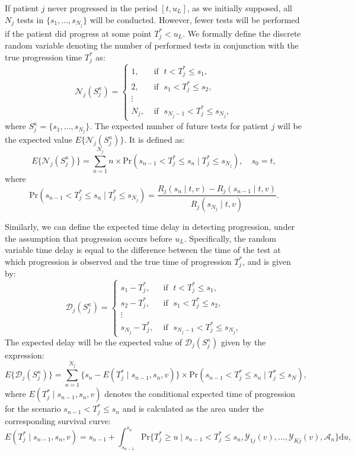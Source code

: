 If patient $j$ never progressed in the period $[t, u_L]$, as we initially supposed, all $N_j$ tests in $\{s_1, \ldots, s_{N_j}\}$ will be conducted. However, fewer tests will be performed if the patient did progress at some point $T_j^* < u_L$. We formally define the discrete random variable denoting the number of performed tests in conjunction with the true progression time $T_j^*$ as:
\[
\mathcal N_j (S^\kappa_j) = \left \{
\begin{array}{ll}
1, & \mbox{ if } \; t < T^*_j \leq s_1,\\
2, & \mbox{ if } \; s_1 < T^*_j \leq s_2,\\
\vdots&\\
N_j, & \mbox{ if } \; s_{N_j-1} < T^*_j \leq s_{N_j},
\end{array}
\right.
\]
where $S^\kappa_j = \{s_1, \ldots, s_{N_j}\}$. The expected number of future tests for patient $j$ will be the expected value $E \big \{\mathcal N_j(S^\kappa_j)\big\}$. It is defined as:
\begin{equation*}
\label{eq:exp_tests}
E \big \{\mathcal N_j(S^\kappa_j)\big\} = \sum_{n = 1}^{N_j} n \times \mbox{Pr}(s_{n-1} < T^*_j \leq s_n \mid T^*_j \leq s_{N_j}), \quad s_0 = t,
\end{equation*}
where 
\begin{equation*}
\mbox{Pr}(s_{n-1} < T^*_j \leq s_n \mid T^*_j \leq s_{N_j}) = \frac{R_j(s_n \mid t, v) - R_j(s_{n-1} \mid t, v)}{R_j(s_{N_j} \mid t, v)}.
\end{equation*}

Similarly, we can define the expected time delay in detecting progression, under the assumption that progression occurs before $u_L$. Specifically, the random variable time delay is equal to the difference between the time of the test at which progression is observed and the true time of progression $T_j^*$, and is given by:
\[
\mathcal D_j (S^\kappa_j) = \left \{
\begin{array}{ll}
s_1 - T_j^*, & \mbox{ if } \; t < T^*_j \leq s_1,\\
s_2 - T_j^*, & \mbox{ if } \; s_1 < T^*_j \leq s_2,\\
\vdots&\\
s_{N_j} - T_j^*, & \mbox{ if } \; s_{N_j-1} < T^*_j \leq s_{N_j},
\end{array}
\right.
\]
The expected delay will be the expected value of $\mathcal D_j (S^\kappa_j)$ given by the expression:
\begin{equation*}
\label{eq:exp_delay}
E \big \{ \mathcal D_j(S^\kappa_j)\big\} = \sum_{n = 1}^{N_j} \Big\{s_n - E(T^*_j \mid s_{n-1}, s_n, v)\Big\} \times \mbox{Pr}(s_{n-1} < T^*_j \leq s_n\mid T^*_j \leq s_N),
\end{equation*}
where $E(T^*_j \mid s_{n-1}, s_n, v)$ denotes the conditional expected time of progression for the scenario $s_{n-1} < T^*_j \leq s_n$ and is calculated as the area under the corresponding survival curve:
\begin{equation*}
E(T^*_j \mid s_{n-1}, s_n, v) = s_{n-1} + \int_{s_{n-1}}^{s_n} \mbox{Pr}\Big\{T^*_j \geq u \mid s_{n-1} < T^*_j \leq s_n, \mathcal{Y}_{1j}(v), \ldots, \mathcal{Y}_{Kj}(v), \mathcal{A}_n\Big\} \mathrm{d}u,
\end{equation*}


